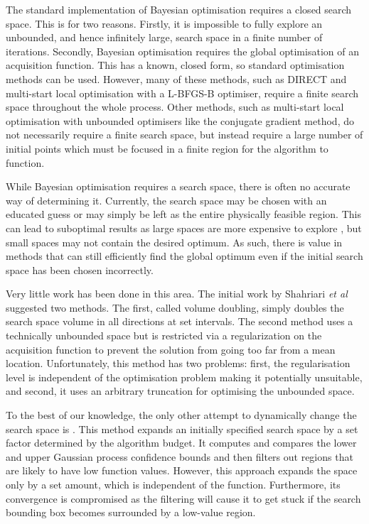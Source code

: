 \documentclass[preprint]{elsarticle}
\begin{document}
The standard implementation of Bayesian optimisation requires a closed search space. This is for two reasons. Firstly, it is impossible to fully explore an unbounded, and hence infinitely large, search space in a finite number of iterations. Secondly, Bayesian \sloppy optimisation requires the global optimisation of an acquisition function. This has a known, closed form, so standard optimisation methods can be used. However, many of these methods, such as DIRECT \citep{jones2001direct} and multi-start local optimisation with a L-BFGS-B optimiser, require a finite search space throughout the whole process. Other methods, such as multi-start local optimisation with unbounded optimisers like the conjugate gradient method, do not necessarily require a finite search space, but instead require a large number of initial points which must be focused in a finite region for the algorithm to function.

While Bayesian optimisation requires a search space, there is often no accurate way of determining it. Currently, the search space may be chosen with an educated guess or may simply be left as the entire physically feasible region. This can lead to suboptimal results as large spaces are more expensive to explore \citep{nguyen2017bayesian}, but small spaces may not contain the desired optimum. As such, there is value in methods that can still efficiently find the global optimum even if the initial search space has been chosen incorrectly.

Very little work has been done in this area. The initial work by Shahriari \emph{et al} \cite{shahriari2016unbounded} suggested two methods. 
The first, called volume doubling, simply doubles the search space volume in all directions at set intervals. The second method uses a technically  unbounded space but is restricted via a regularization
on the acquisition function to prevent the solution from going
too far from a mean location. Unfortunately, this method has two problems: first, the regularisation level is independent of the optimisation problem making it potentially unsuitable, and second, it uses an arbitrary truncation for optimising the unbounded space.

To the best of our knowledge, the only other attempt to dynamically change
the search space is \cite{nguyen2018filtering}. This method expands an initially specified search space by a set factor determined by the algorithm budget. It computes and compares the lower and upper Gaussian process confidence bounds and then filters out
regions that are likely to have low function values. However, this approach expands the space only by a set amount, which is independent of the function. Furthermore, its convergence is compromised as the filtering will cause it to get stuck if the search bounding box becomes surrounded by a low-value region.
\end{document}
